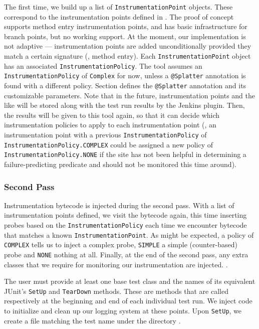 The first time, we build up a list of {\tt InstrumentationPoint} objects. These correspond to the instrumentation points defined in . The proof of concept supports method entry instrumentation points, and has basic infrastructure for branch points, but no working support. At the moment, our implementation is not adaptive --- instrumentation points are added unconditionally provided they match a certain signature (\eg, method entry). Each {\tt InstrumentationPoint} object has an associated {\tt InstrumentationPolicy}. The tool assumes an {\tt InstrumentationPolicy} of {\tt Complex} for now, unless a {\tt @Splatter} annotation is found with a different policy. Section \todo{[]} defines the {\tt @Splatter} annotation and its customizable parameters. Note that in the future, instrumentation points and the like will be stored along with the test run results by the Jenkins plugin. Then, the results will be given to this tool again, so that it can decide which instrumentation policies to apply to each instrumentation point (\eg, an instrumentation point with a previous {\tt InstrumentationPolicy} of {\tt InstrumentationPolicy.COMPLEX} could be assigned a new policy of {\tt InstrumentationPolicy.NONE} if the site has not been helpful in determining a failure-predicting predicate and should not be monitored this time around).

\subsubsection{Second Pass}

Instrumentation bytecode is injected during the second pass. With a list of instrumentation points defined, we visit the bytecode again, this time inserting probes based on the {\tt InstrumentationPolicy} each time we encounter bytecode that matches a known {\tt InstrumentationPoint}. As might be expected, a policy of {\tt COMPLEX} tells us to inject a complex probe, {\tt SIMPLE} a simple (counter-based) probe and {\tt NONE} nothing at all. Finally, at the end of the second pass, any extra classes that we require for monitoring our instrumentation are injected. .

The user must provide at least one base test class and the names of its equivalent JUnit's {\tt SetUp} and {\tt TearDown} methods. These are methods that are called respectively at the beginning and end of each individual test run. We inject code to initialize and clean up our logging system at these points. Upon {\tt SetUp}, we create a file matching the test name  under the directory .

